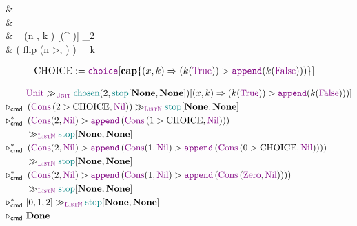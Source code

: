 \begin{codealign}
  &
    \polprd\ \type\ \Unittype\ \where
  \\[-4pt]
  &\quad
    \Unit
  \\
  &
    \
    \chosen
    (n \prd \Nat, k \con \ListNat)
    [\Unittype \times (\Bool \to^{\polprd} \ListNat)]
    \con
    \Unittype
    \coloneq \match_{2}
  \\[-4pt]
  &\quad
    \Unit
    \Rightarrow
    \left(
      \textsf{flip}
      \Rightarrow
      \Cons(n >, \Nil)
    \right)
    \mkCmd_{\ListNat}
    k
\end{codealign}

\begin{align*}
  \text{CHOICE}
  &:=
  \choice[\capab\{ (x, k) \Rightarrow (k(\True)) > \append (k(\False))) \}]
\end{align*}

\begin{align*}
  \phantom{\reducesto_{\cmd}}
  &
  \Unit
  \mkCmd_{\Unittype}
  \chosen(2, \stopListNat[\None, \None])
  [(x, k) \Rightarrow (k(\True)) > \append (k(\False)))]
  \\
  \reducesto_{\cmd}\
  &
  \left(
    \Cons
    \left(
      2 > \text{CHOICE},
      \Nil
    \right)
  \right)
  \mkCmd_{\ListNat}
  \stopListNat[\None, \None]
  \\
  \reducesto_{\cmd}^{\ast}\
  &
  \left(
    \Cons(2, \Nil)
    >
    \append
    \left(
      \Cons
      \left(
        1 > \text{CHOICE},
        \Nil
      \right)
    \right)
  \right)
  \\
  &
  \mkCmd_{\ListNat}
  \stopListNat[\None, \None]
  \\
  \reducesto_{\cmd}^{\ast}\
  &
  \left(
    \Cons(2, \Nil)
    >
    \append
    \left(
      \Cons(1, \Nil)
      >
      \append
      \left(
        \Cons
        \left(
          0 > \text{CHOICE},
          \Nil
        \right)
      \right)
    \right)
  \right)
  \\
  &
  \mkCmd_{\ListNat}
  \stopListNat[\None, \None]
  \\
  \reducesto_{\cmd}^{\ast}\
  &
  \left(
    \Cons(2, \Nil)
    >
    \append
    \left(
      \Cons(1, \Nil)
      >
      \append
      \left(
        \Cons
        \left(
          \Zero,
          \Nil
        \right)
      \right)
    \right)
  \right)
  \\
  &
  \mkCmd_{\ListNat}
  \stopListNat[\None, \None]
  \\
  \reducesto_{\cmd}^{\ast}\
  &
  [0,1,2]
  \mkCmd_{\ListNat}
  \stopListNat[\None, \None]
  \\
  \reducesto_{\cmd}\
  &
  \Done
\end{align*}
